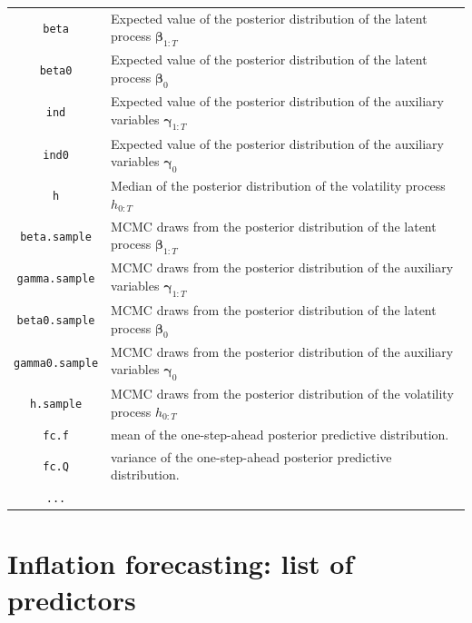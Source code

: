 \documentclass[
  12pt,
]{book}
\theoremstyle{break}
\theoremstyle{nonumberplain}
\begin{document}
\begin{small}
\begin{longtable}{ c l }
\texttt{beta} & Expected value of the posterior distribution of the latent process $\boldsymbol{\beta}_{1:T}$\\
\texttt{beta0} & Expected value of the posterior distribution of the latent process $\boldsymbol{\beta}_{0}$\\
\texttt{ind} & Expected value of the posterior distribution of the auxiliary variables $\boldsymbol{\gamma}_{1:T}$ \\
\texttt{ind0} & Expected value of the posterior distribution of the auxiliary variables $\boldsymbol{\gamma}_{0}$ \\
\texttt{h} & Median of the posterior distribution of the volatility process $h_{0:T}$ \\
\texttt{beta.sample} & MCMC draws from the posterior distribution of the latent process $\boldsymbol{\beta}_{1:T}$  \\
\texttt{gamma.sample} &  MCMC draws from the posterior distribution of the auxiliary variables $\boldsymbol{\gamma}_{1:T}$\\
\texttt{beta0.sample} & MCMC draws from the posterior distribution of the latent process $\boldsymbol{\beta}_{0}$  \\
\texttt{gamma0.sample} &  MCMC draws from the posterior distribution of the auxiliary variables $\boldsymbol{\gamma}_{0}$\\
\texttt{h.sample} &  MCMC draws from the posterior distribution of the volatility process $h_{0:T}$ \\
\texttt{fc.f} & mean of the one-step-ahead posterior predictive distribution.\\
\texttt{fc.Q} & variance of the one-step-ahead posterior predictive distribution.\\
\texttt{...} & 
\end{longtable}
\end{small}

\newpage
\section{Inflation forecasting: list of predictors}
\end{document}
